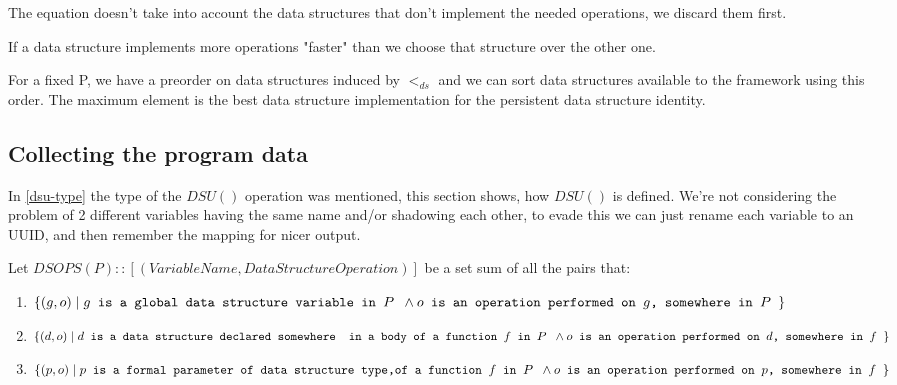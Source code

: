 \documentclass[a4paper,11pt]{article}
\begin{document}
		The equation doesn't take into account the data structures that don't implement the needed operations,
		we discard them first.

		If a data structure implements more operations "faster" than we choose that structure over
		the other one.

		For a fixed P, we have a preorder on data structures induced by $<_{ds}$ and we can sort data structures
		available to the framework using this order. The maximum element is the best data structure
		implementation for the persistent data structure identity.

	\subsection{Collecting the program data} \label{dsu-definition}

		In \autoref{dsu-type} the type of the $DSU()$ operation was mentioned, this section shows, how $DSU()$ is
		defined. We're not considering the problem of 2 different variables having the same name and/or shadowing each
        other, to evade this we can just rename each variable to an UUID, and then remember the mapping for nicer
        output.

		Let $DSOPS(P) :: [(VariableName, DataStructureOperation)]$ be a set sum of all the pairs that:
		\begin{enumerate}

			\item \label{it:global} $\{(g, o)\; |\; g \texttt{ is a global data structure variable in $P$ }
				\wedge \\ o \texttt{ is an operation performed on $g$, somewhere in $P$ } \}$

			\item \label{it:auto} $\{(d, o)\; |\; d \texttt{ is a data structure declared somewhere } \\
				\texttt{ in a body of a function $f$ in $P$ } \wedge \\ o \texttt{ is an operation
				performed on $d$, somewhere in $f$ } \}$

			\item \label{it:param} $\{(p, o)\; |\; p \texttt{ is a formal parameter of data structure type,}
				\\ \texttt{of a function $f$ in $P$ } \wedge \\ o \texttt{ is an operation performed on
				$p$, somewhere in $f$ } \}$

		\end{enumerate}
\end{document}
